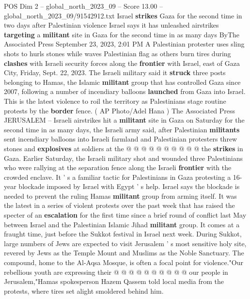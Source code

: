 \begin{textsample}{POS Dim 2 – global\_north\_2023\_09 – Score 13.00 – global\_north\_2023\_09/91542912.txt}  \label{ex:f2_pos_134}
Israel \textbf{strikes} Gaza for the second time in two days after Palestinian violence Israel says it has unleashed airstrikes \textbf{targeting} a \textbf{militant} site in Gaza for the second time in as many days ByThe Associated Press September 23, 2023, 2:01 PM A Palestinian protester uses sling shots to hurls stones while waves Palestinian flag as others burn tires during \textbf{clashes} with Israeli security forces along the \textbf{frontier} with Israel, east of Gaza City, Friday, Sept. 22, 2023.
The Israeli military said it \textbf{struck} three posts belonging to Hamas, the Islamic \textbf{militant} group that has controlled Gaza since 2007, following a number of incendiary balloons \textbf{launched} from Gaza into Israel.
This is the latest violence to roil the territory as Palestinians stage routine protests by the \textbf{border} fence. ( AP Photo/Adel Hana ) The Associated Press JERUSALEM -- Israeli airstrikes hit a \textbf{militant} site in Gaza on Saturday for the second time in as many days, the Israeli army said, after Palestinian \textbf{militants} sent incendiary balloons into Israeli farmland and Palestinian protesters threw stones and \textbf{explosives} at soldiers at the @ @ @ @ @ @ @ @ @ @ the \textbf{strikes} in Gaza.
Earlier Saturday, the Israeli military shot and wounded three Palestinians who were rallying at the separation fence along the Israeli \textbf{frontier} with the crowded enclave.
It ' s a familiar tactic for Palestinians in Gaza protesting a 16-year blockade imposed by Israel with Egypt ' s help.
Israel says the blockade is needed to prevent the ruling Hamas \textbf{militant} group from arming itself.
It was the latest in a series of violent protests over the past week that has raised the specter of an \textbf{escalation} for the first time since a brief round of conflict last May between Israel and the Palestinian Islamic Jihad \textbf{militant} group.
It comes at a fraught time, just before the Sukkot festival in Israel next week.
During Sukkot, large numbers of Jews are expected to visit Jerusalem ' s most sensitive holy site, revered by Jews as the Temple Mount and Muslims as the Noble Sanctuary.
The compound, home to the Al-Aqsa Mosque, is often a focal point for violence."Our rebellious youth are expressing their @ @ @ @ @ @ @ @ @ @ our people in Jerusalem,"Hamas spokesperson Hazem Qassem told local media from the protests, where tires set alight smoldered behind him.

\end{textsample}
